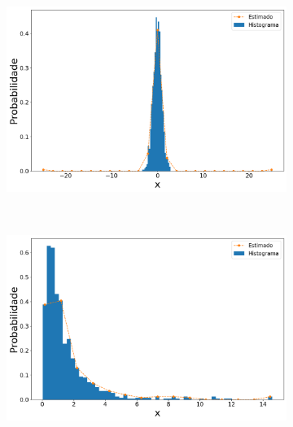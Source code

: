 \begin{figure}[H]
\begin{subfigure}[b]{0.45\textwidth}
		\caption{}
		\label{fig:lin_norm15_data_out}
	\end{subfigure}
	\hfill
	\begin{subfigure}[b]{0.45\textwidth}
		\centering 
		\includegraphics[width=\linewidth]{./figuras/Linspace_normal_25_1000_25}
		\caption{}
		\label{fig:lin_norm25_data_out}
	\end{subfigure}
	\\
	\begin{subfigure}[b]{0.45\textwidth}
		\centering 
		\includegraphics[width=\linewidth]{./figuras/Linspace_lognormal_15_1000}
		\caption{}
		\label{fig:lin_lognorm15_data}
	\end{subfigure}
	\hfill
	\begin{subfigure}[b]{0.45\textwidth}
		\centering 

\end{subfigure}
\end{figure}
